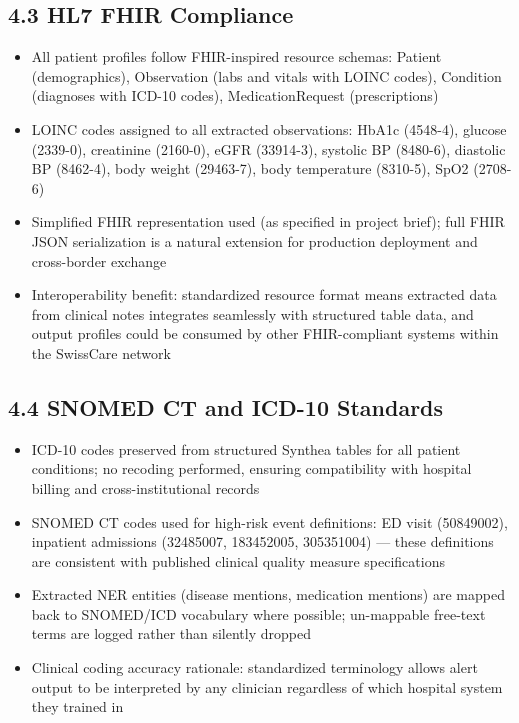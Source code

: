\documentclass[11pt,a4paper]{article}
\begin{document}
\subsection{4.3 HL7 FHIR Compliance}
\begin{itemize}
\item All patient profiles follow FHIR-inspired resource schemas: Patient (demographics), Observation (labs and vitals with LOINC codes), Condition (diagnoses with ICD-10 codes), MedicationRequest (prescriptions)
\item LOINC codes assigned to all extracted observations: HbA1c (4548-4), glucose (2339-0), creatinine (2160-0), eGFR (33914-3), systolic BP (8480-6), diastolic BP (8462-4), body weight (29463-7), body temperature (8310-5), SpO2 (2708-6)
\item Simplified FHIR representation used (as specified in project brief); full FHIR JSON serialization is a natural extension for production deployment and cross-border exchange
\item Interoperability benefit: standardized resource format means extracted data from clinical notes integrates seamlessly with structured table data, and output profiles could be consumed by other FHIR-compliant systems within the SwissCare network
\end{itemize}

\subsection{4.4 SNOMED CT and ICD-10 Standards}
\begin{itemize}
\item ICD-10 codes preserved from structured Synthea tables for all patient conditions; no recoding performed, ensuring compatibility with hospital billing and cross-institutional records
\item SNOMED CT codes used for high-risk event definitions: ED visit (50849002), inpatient admissions (32485007, 183452005, 305351004) --- these definitions are consistent with published clinical quality measure specifications
\item Extracted NER entities (disease mentions, medication mentions) are mapped back to SNOMED/ICD vocabulary where possible; un-mappable free-text terms are logged rather than silently dropped
\item Clinical coding accuracy rationale: standardized terminology allows alert output to be interpreted by any clinician regardless of which hospital system they trained in
\end{itemize}
\end{document}
